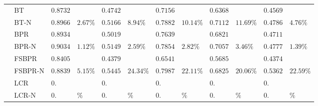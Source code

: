 \documentclass[letterpaper]{article} %
\begin{document}
\begin{table}[htp]
\begin{center}
\begin{tabular}{p{0.4cm}<{\centering}|p{1.2cm}<{\centering} |p{0.5cm} p{0.6cm} |p{0.5cm} p{0.6cm} |p{0.5cm} p{0.6cm}|p{0.5cm} p{0.6cm} |p{0.5cm} p{0.6cm}}
	\hline
{}	&BT	& $0.8732 $&  &$0.4742$& &$0.7156$&   &$0.6368$& 	& $0.4569$ 	&\\
	&BT-N	&$0.8966$ &	$2.67\%$	&$0.5166 $	&$8.94\%$	&$0.7882$ &	$10.14\%$	&$0.7112$ &	$11.69\%$	&$0.4786 $	&$4.76\%$\\
	&BPR&	$0.8934$ 	&&	$0.5019$ 	&&	$0.7639$ & &$0.6821$& 	& $0.4711$ 	&\\
	&BPR-N	&$0.9034$ 	&$1.12\%$	&$0.5149$ &	$2.59\%$	&$0.7854$ 	&$2.82\%$ &$0.7057$ &	$3.46\%$	&$0.4777 $	&$1.39\%$	\\
	&FSBPR		&$0.8405$&	&$0.4379$ 	&&	$0.6541$& &$0.5685$& 	& $0.4374$ 	&\\	
	&FSBPR-N	&$0.8839$	&$5.15\%$	&	$0.5445$ 	&$24.34\%$	&$0.7987$ 	&$22.11\%$ &$0.6825$ &	$20.06\%$	&$0.5362 $	&$22.59\%$	\\
	&LCR		&$0.$&	&$0.$ 	&&	$0.$& &$0.$& 	& $0.$ 	&\\	
	&LCR-N	&$0.$	&$\%$	&	$0.$ 	&$\%$	&$0.$ 	&$\%$ &$0.$ &	$\%$	&$0. $	&$\%$\\
	\hline
	\end{tabular}
\end{center}
\label{tab:ratingresult}
\end{table}%
\end{document}
